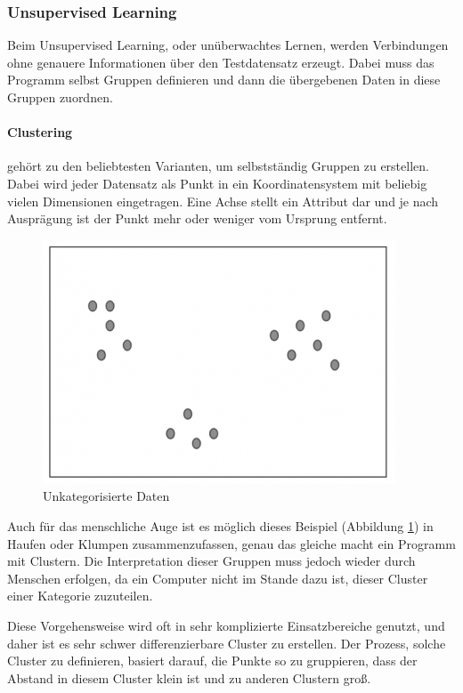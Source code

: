 \subsubsection{Unsupervised Learning}

Beim Unsupervised Learning, oder unüberwachtes Lernen, werden Verbindungen ohne genauere Informationen über den Testdatensatz erzeugt. Dabei muss das Programm selbst Gruppen definieren und dann die übergebenen Daten in diese Gruppen zuordnen. \cite{SL:online}

\paragraph{Clustering} gehört zu den beliebtesten Varianten, um selbstständig Gruppen zu erstellen. Dabei wird jeder Datensatz als Punkt in ein Koordinatensystem mit beliebig vielen Dimensionen eingetragen. Eine Achse stellt ein Attribut dar und je nach Ausprägung ist der Punkt mehr oder weniger vom Ursprung entfernt.

\begin{figure}[H]
    \centering
    \includegraphics[scale=0.8]{sections/machine-learning/images/unclustered-data.png}
    \caption{Unkategorisierte Daten}
    \label{fig:unclustered-data}
\end{figure}

Auch für das menschliche Auge ist es möglich dieses Beispiel (Abbildung \ref{fig:unclustered-data}) in Haufen oder Klumpen zusammenzufassen, genau das gleiche macht ein Programm mit Clustern. Die Interpretation dieser Gruppen muss jedoch wieder durch Menschen erfolgen, da ein Computer nicht im Stande dazu ist, dieser Cluster einer Kategorie zuzuteilen.

Diese Vorgehensweise wird oft in sehr komplizierte Einsatzbereiche genutzt, und daher ist es sehr schwer differenzierbare Cluster zu erstellen. Der Prozess, solche Cluster zu definieren, basiert darauf, die Punkte so zu gruppieren, dass der Abstand in diesem Cluster klein ist und zu anderen Clustern groß.

